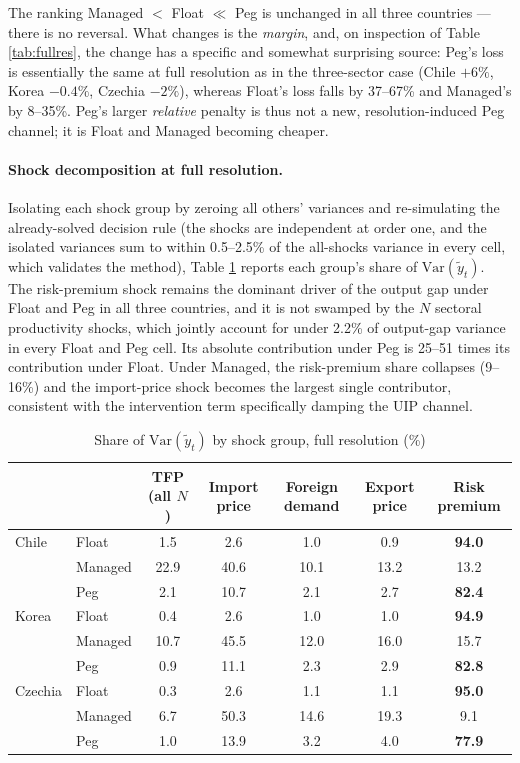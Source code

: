 \documentclass[12pt]{article}
\begin{document}
The ranking Managed $<$ Float $\ll$ Peg is unchanged in all three countries --- there is no reversal.
What changes is the \emph{margin}, and, on inspection of Table \ref{tab:fullres}, the change has a
specific and somewhat surprising source: Peg's loss is essentially the same at full resolution as in
the three-sector case (Chile $+6\%$, Korea $-0.4\%$, Czechia $-2\%$), whereas Float's loss falls by
37--67\% and Managed's by 8--35\%. Peg's larger \emph{relative} penalty is thus not a new,
resolution-induced Peg channel; it is Float and Managed becoming cheaper.

\paragraph{Shock decomposition at full resolution.} Isolating each shock group by zeroing all others'
variances and re-simulating the already-solved decision rule (the shocks are independent at order one,
and the isolated variances sum to within 0.5--2.5\% of the all-shocks variance in every cell, which
validates the method), Table \ref{tab:fullres_decomp} reports each group's share of $\mathrm{Var}(\tilde y_t)$. The
risk-premium shock remains the dominant driver of the output gap under Float and Peg in all three
countries, and it is not swamped by the $N$ sectoral productivity shocks, which jointly account for
under 2.2\% of output-gap variance in every Float and Peg cell. Its absolute contribution under Peg is 25--51 times
its contribution under Float. Under Managed, the risk-premium share collapses (9--16\%) and the
import-price shock becomes the largest single contributor, consistent with the intervention term
specifically damping the UIP channel.

\begin{table}[H]
\centering
\caption{Share of $\mathrm{Var}(\tilde y_t)$ by shock group, full resolution (\%)}
\label{tab:fullres_decomp}
\begin{tabular}{llccccc}
\toprule
 & & TFP (all $N$) & Import price & Foreign demand & Export price & \textbf{Risk premium} \\
\midrule
Chile & Float & 1.5 & 2.6 & 1.0 & 0.9 & \textbf{94.0} \\
      & Managed & 22.9 & 40.6 & 10.1 & 13.2 & 13.2 \\
      & Peg & 2.1 & 10.7 & 2.1 & 2.7 & \textbf{82.4} \\
Korea & Float & 0.4 & 2.6 & 1.0 & 1.0 & \textbf{94.9} \\
      & Managed & 10.7 & 45.5 & 12.0 & 16.0 & 15.7 \\
      & Peg & 0.9 & 11.1 & 2.3 & 2.9 & \textbf{82.8} \\
Czechia & Float & 0.3 & 2.6 & 1.1 & 1.1 & \textbf{95.0} \\
      & Managed & 6.7 & 50.3 & 14.6 & 19.3 & 9.1 \\
      & Peg & 1.0 & 13.9 & 3.2 & 4.0 & \textbf{77.9} \\
\bottomrule
\end{tabular}
\end{table}
\end{document}
